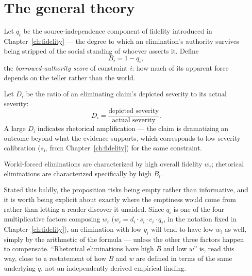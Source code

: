 \section{The general theory}

\begin{definition}
Let $q_i$ be the source-independence component of fidelity introduced in Chapter~\ref{ch:fidelity} --- the degree to which an elimination's authority survives being stripped of the social standing of whoever asserts it. Define
\[
B_i = 1 - q_i,
\]
the \emph{borrowed-authority score} of constraint $i$: how much of its apparent force depends on the teller rather than the world.
\end{definition}

\begin{definition}
Let $D_i$ be the ratio of an eliminating claim's depicted severity to its actual severity:
\[
D_i = \frac{\text{depicted severity}}{\text{actual severity}}.
\]
A large $D_i$ indicates rhetorical amplification --- the claim is dramatizing an outcome beyond what the evidence supports, which corresponds to low severity calibration ($s_i$, from Chapter~\ref{ch:fidelity}) for the same constraint.
\end{definition}

\begin{proposition}
World-forced eliminations are characterized by high overall fidelity $w_i$; rhetorical eliminations are characterized specifically by high $B_i$.
\end{proposition}

Stated this baldly, the proposition risks being empty rather than informative, and it is worth being explicit about exactly where the emptiness would come from rather than letting a reader discover it unaided. Since $q_i$ is one of the four multiplicative factors composing $w_i$ ($w_i = d_i \cdot s_i \cdot c_i \cdot q_i$, in the notation fixed in Chapter~\ref{ch:fidelity}), an elimination with low $q_i$ will tend to have low $w_i$ as well, simply by the arithmetic of the formula --- unless the other three factors happen to compensate. ``Rhetorical eliminations have high $B$ and low $w$'' is, read this way, close to a restatement of how $B$ and $w$ are defined in terms of the same underlying $q$, not an independently derived empirical finding.

